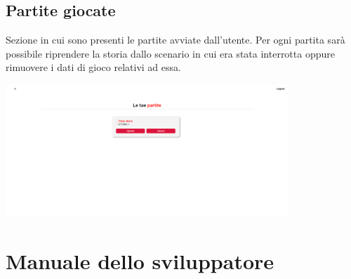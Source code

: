 \documentclass{article}
\begin{document}
\subsection*{Partite giocate}
Sezione in cui sono presenti le partite avviate dall'utente. Per ogni partita sarà possibile riprendere la storia dallo scenario in cui era stata interrotta oppure rimuovere i dati di gioco relativi ad essa.
\begin{center}
    \includegraphics[width=0.8\textwidth]{foto26.png}
\end{center}

\clearpage
\section*{Manuale dello sviluppatore}
\end{document}
